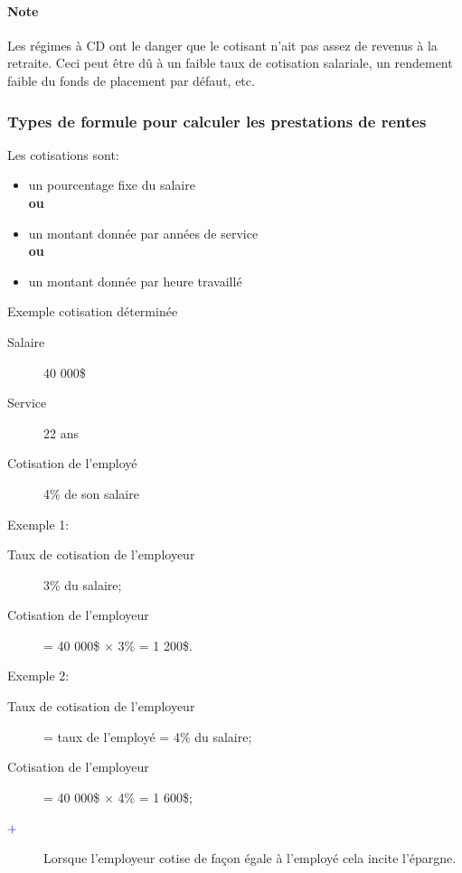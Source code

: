 \documentclass[10pt, french]{article}
\begin{document}
\begin{multicols*}{3}
\paragraph{Note}	Les régimes à CD ont le danger que le cotisant n'ait pas assez de revenus à la retraite. Ceci peut être dû à un faible taux de cotisation salariale, un rendement faible du fonds de placement par défaut, etc.

\subsubsection*{Types de formule pour calculer les prestations de rentes}

\begin{definitionNOHFILL}
Les cotisations sont: 
\begin{itemize}[leftmargin = *]
	\item	un pourcentage fixe du salaire \\
			\textbf{ou}
	\item	un montant donnée par années de service\\
			\textbf{ou}
	\item	un montant donnée par heure travaillé
\end{itemize}
\end{definitionNOHFILL}

\begin{conceptgen}{Exemple cotisation déterminée}
\begin{description}
	\item[Salaire]	40 000\$
	\item[Service]	22 ans
	\item[Cotisation de l'employé] 4\% de son salaire	
\end{description}
\tcbline
Exemple 1: 
\begin{description}
	\item[Taux de cotisation de l'employeur]	3\% du salaire;
	\item[Cotisation de l'employeur]	= 40 000\$ $\times$ 3\% = 1 200\$.
\end{description}	 
	
\tcbline

Exemple 2: 
\begin{description}
	\item[Taux de cotisation de l'employeur]	= taux de l'employé = 4\% du salaire;
	\item[Cotisation de l'employeur]	= 40 000\$ $\times$ 4\% = 1 600\$;
	\item[$\color{blue}+$]	Lorsque l'employeur cotise de façon égale à l'employé cela incite l'épargne.
\end{description}
	

\end{conceptgen}
\end{multicols*}
\end{document}
